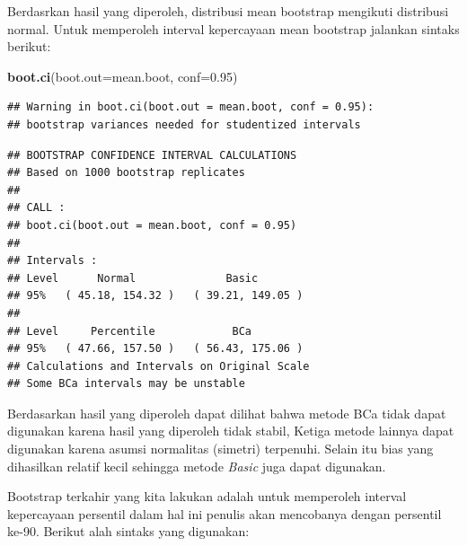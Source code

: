 \documentclass[]{book}
\newenvironment{Shaded}{\begin{snugshade}}{\end{snugshade}}
\newcommand{\KeywordTok}[1]{\textcolor[rgb]{0.13,0.29,0.53}{\textbf{#1}}}
\newcommand{\DataTypeTok}[1]{\textcolor[rgb]{0.13,0.29,0.53}{#1}}
\newcommand{\DecValTok}[1]{\textcolor[rgb]{0.00,0.00,0.81}{#1}}
\newcommand{\FloatTok}[1]{\textcolor[rgb]{0.00,0.00,0.81}{#1}}
\newcommand{\StringTok}[1]{\textcolor[rgb]{0.31,0.60,0.02}{#1}}
\newcommand{\CommentTok}[1]{\textcolor[rgb]{0.56,0.35,0.01}{\textit{#1}}}
\newcommand{\ControlFlowTok}[1]{\textcolor[rgb]{0.13,0.29,0.53}{\textbf{#1}}}
\newcommand{\OperatorTok}[1]{\textcolor[rgb]{0.81,0.36,0.00}{\textbf{#1}}}
\newcommand{\NormalTok}[1]{#1}
\begin{document}
Berdasrkan hasil yang diperoleh, distribusi mean bootstrap mengikuti
distribusi normal. Untuk memperoleh interval kepercayaan mean bootstrap
jalankan sintaks berikut:

\begin{Shaded}
\begin{Highlighting}[]
\KeywordTok{boot.ci}\NormalTok{(}\DataTypeTok{boot.out=}\NormalTok{mean.boot, }\DataTypeTok{conf=}\FloatTok{0.95}\NormalTok{)}
\end{Highlighting}
\end{Shaded}

\begin{verbatim}
## Warning in boot.ci(boot.out = mean.boot, conf = 0.95):
## bootstrap variances needed for studentized intervals
\end{verbatim}

\begin{verbatim}
## BOOTSTRAP CONFIDENCE INTERVAL CALCULATIONS
## Based on 1000 bootstrap replicates
## 
## CALL : 
## boot.ci(boot.out = mean.boot, conf = 0.95)
## 
## Intervals : 
## Level      Normal              Basic         
## 95%   ( 45.18, 154.32 )   ( 39.21, 149.05 )  
## 
## Level     Percentile            BCa          
## 95%   ( 47.66, 157.50 )   ( 56.43, 175.06 )  
## Calculations and Intervals on Original Scale
## Some BCa intervals may be unstable
\end{verbatim}

Berdasarkan hasil yang diperoleh dapat dilihat bahwa metode BCa tidak
dapat digunakan karena hasil yang diperoleh tidak stabil, Ketiga metode
lainnya dapat digunakan karena asumsi normalitas (simetri) terpenuhi.
Selain itu bias yang dihasilkan relatif kecil sehingga metode
\emph{Basic} juga dapat digunakan.

Bootstrap terkahir yang kita lakukan adalah untuk memperoleh interval
kepercayaan persentil dalam hal ini penulis akan mencobanya dengan
persentil ke-90. Berikut alah sintaks yang digunakan:

\begin{Shaded}
\end{Shaded}
\end{document}
